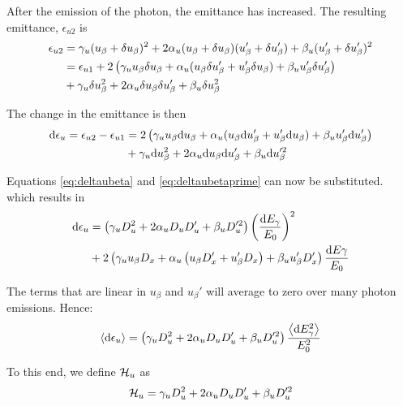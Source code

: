 After the emission of the photon, the emittance has increased. The resulting emittance, $\epsilon_{u2}$ is
\begin{align}
    \epsilon_{u2}   &= \gamma_u (u_\beta + \delta u_\beta)^2 + 2 \alpha_u (u_\beta + \delta u_\beta)(u_\beta' + \delta u_\beta') + \beta_u (u_\beta' + \delta u_\beta')^2 \notag\\
                    &= \epsilon_{u1} + 2 \left( \gamma_u u_\beta \delta u_\beta + \alpha_u (u_\beta \delta u_\beta' + u_\beta' \delta u_\beta) + \beta_u u_\beta' \delta u_\beta' \right)\notag \\
                    &+ \gamma_u \delta u_\beta^2 + 2 \alpha_u \delta u_\beta \delta u_\beta' + \beta_u \delta u_\beta^2
\end{align}

The change in the emittance is then
\begin{align}
    \text{d} \epsilon_u = \epsilon_{u2} - \epsilon_{u1} &= 2 \left( \gamma_u u_\beta \text{d} u_\beta + \alpha_u (u_\beta \text{d} u_\beta' + u_\beta' \text{d} u_\beta) + \beta_u u_\beta' \text{d} u_\beta' \right)\notag\\
                    &+ \gamma_u \text{d} u_\beta^2 + 2 \alpha_u \text{d} u_\beta \text{d} u_\beta' + \beta_u \text{d} u_\beta'^2
\end{align}

Equations \eqref{eq:deltaubeta} and \eqref{eq:deltaubetaprime} can now be substituted. which results in
\begin{align}
    \text{d} \epsilon_u &= \left( \gamma_u D_u^2 + 2 \alpha_u D_u D_u' + \beta_u D_u'^2 \right) \left( \frac{\text{d} E_\gamma}{E_0} \right)^2 \notag\\
                    &+ 2 \left( \gamma_u u_\beta D_x + \alpha_u \left( u_\beta D_x' + u_\beta' D_x \right) + \beta_u u_\beta'D_x' \right) \frac{\text{d} E\gamma}{E_0}
\end{align}

The terms that are linear in $u_\beta$ and $u_\beta'$ will average to zero over many photon emissions. Hence:
\begin{equation}
    \left\langle {\text{d}\epsilon_u} \right\rangle = \left( \gamma_u D_u^2 + 2 \alpha_u D_u D_u' + \beta_u D_u'^2 \right) \frac{\left\langle {\text{d}E_\gamma^2} \right\rangle}{E_0^2}
\end{equation}

To this end, we define $\mathcal{H}_u$ as
\begin{equation}
    \mathcal{H}_u = \gamma_u D_u^2 + 2 \alpha_u D_u D_u' + \beta_u D_u'^2
\end{equation}

